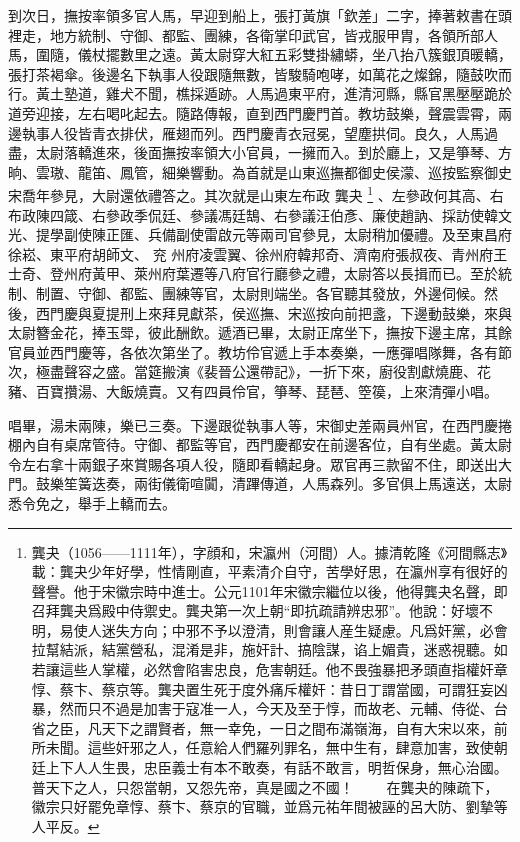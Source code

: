 到次日，撫按率領多官人馬，早迎到船上，張打黃旗「欽差」二字，捧著敕書在頭裡走，地方統制、守御、都監、團練，各衛掌印武官，皆戎服甲胄，各領所部人馬，圍隨，儀杖擺數里之遠。黃太尉穿大紅五彩雙掛繡蟒，坐八抬八簇銀頂暖轎，張打茶褐傘。後邊名下執事人役跟隨無數，皆駿騎咆哮，如萬花之燦錦，隨鼓吹而行。黃土塾道，雞犬不聞，樵採遁跡。人馬過東平府，進清河縣，縣官黑壓壓跪於道旁迎接，左右喝叱起去。隨路傳報，直到西門慶門首。教坊鼓樂，聲震雲霄，兩邊執事人役皆青衣排伏，雁翅而列。西門慶青衣冠冕，望塵拱伺。良久，人馬過盡，太尉落轎進來，後面撫按率領大小官員，一擁而入。到於廳上，又是箏琴、方晌、雲璈、龍笛、鳳管，細樂響動。為首就是山東巡撫都御史侯濛、巡按監察御史宋喬年參見，大尉還依禮答之。其次就是山東左布政
龔夬 \footnote{龔夬（1056——1111年），字顔和，宋瀛州（河間）人。據清乾隆《河間縣志》載：龔夬少年好學，性情剛直，平素清介自守，苦學好思，在瀛州享有很好的聲譽。他于宋徽宗時中進士。公元1101年宋徽宗繼位以後，他得龔夬名聲，即召拜龔夬爲殿中侍禦史。龔夬第一次上朝“即抗疏請辨忠邪”。他說：好壞不明，易使人迷失方向；中邪不予以澄清，則會讓人産生疑慮。凡爲奸黨，必會拉幫結派，結黨營私，混淆是非，施奸計、搞陰謀，谄上媚貴，迷惑視聽。如若讓這些人掌權，必然會陷害忠良，危害朝廷。他不畏強暴把矛頭直指權奸章惇、蔡卞、蔡京等。龔夬置生死于度外痛斥權奸：昔日丁謂當國，可謂狂妄凶暴，然而只不過是加害于寇准一人，今天及至于惇，而故老、元輔、侍從、台省之臣，凡天下之謂賢者，無一幸免，一日之間布滿嶺海，自有大宋以來，前所未聞。這些奸邪之人，任意給人們羅列罪名，無中生有，肆意加害，致使朝廷上下人人生畏，忠臣義士有本不敢奏，有話不敢言，明哲保身，無心治國。普天下之人，只怨當朝，又怨先帝，真是國之不國！
　　在龔夬的陳疏下，徽宗只好罷免章惇、蔡卞、蔡京的官職，並爲元祐年間被誣的呂大防、劉摯等人平反。}
、左參政何其高、右布政陳四箴、右參政季侃廷、參議馮廷鵠、右參議汪伯彥、廉使趙訥、採訪使韓文光、提學副使陳正匯、兵備副使雷啟元等兩司官參見，太尉稍加優禮。及至東昌府徐崧、東平府胡師文、
兖 %
州府凌雲翼、徐州府韓邦奇、濟南府張叔夜、青州府王士奇、登州府黃甲、萊州府葉遷等八府官行廳參之禮，太尉答以長揖而已。至於統制、制置、守御、都監、團練等官，太尉則端坐。各官聽其發放，外邊伺候。然後，西門慶與夏提刑上來拜見獻茶，侯巡撫、宋巡按向前把盞，下邊動鼓樂，來與太尉簪金花，捧玉斝，彼此酬飲。遞酒已畢，太尉正席坐下，撫按下邊主席，其餘官員並西門慶等，各依次第坐了。教坊伶官遞上手本奏樂，一應彈唱隊舞，各有節次，極盡聲容之盛。當筵搬演《裴晉公還帶記》，一折下來，廚役割獻燒鹿、花豬、百寶攢湯、大飯燒賣。又有四員伶官，箏琴、琵琶、箜篌，上來清彈小唱。

唱畢，湯未兩陳，樂已三奏。下邊跟從執事人等，宋御史差兩員州官，在西門慶捲棚內自有桌席管待。守御、都監等官，西門慶都安在前邊客位，自有坐處。黃太尉令左右拿十兩銀子來賞賜各項人役，隨即看轎起身。眾官再三款留不住，即送出大門。鼓樂笙簧迭奏，兩街儀衛喧闐，清蹕傳道，人馬森列。多官俱上馬遠送，太尉悉令免之，舉手上轎而去。

